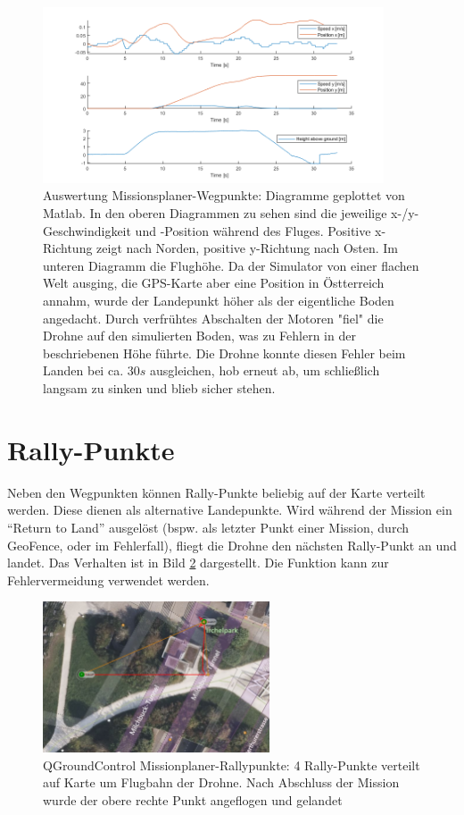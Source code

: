 \begin{figure}[h]
    \centering
    \includegraphics[width=0.9\textwidth]{images/mission_plan_mission_dia.png}
    \caption[Auswertung Missionsplaner-Wegpunkte]{Auswertung Missionsplaner-Wegpunkte: Diagramme geplottet von Matlab. In den oberen Diagrammen zu sehen sind die jeweilige x-/y-Geschwindigkeit und -Position während des Fluges. Positive x-Richtung zeigt nach Norden, positive y-Richtung nach Osten. Im unteren Diagramm die Flughöhe. Da der Simulator von einer flachen Welt ausging, die GPS-Karte aber eine Position in Östterreich annahm, wurde der Landepunkt höher als der eigentliche Boden angedacht. Durch verfrühtes Abschalten der Motoren "fiel" die Drohne auf den simulierten Boden, was zu Fehlern in der beschriebenen Höhe führte. Die Drohne konnte diesen Fehler beim Landen bei ca. $30s$ ausgleichen, hob erneut ab, um schließlich langsam zu sinken und blieb sicher stehen.}
    \label{fig:qgc_mission_plan_wp_dia}
\end{figure}

\section{Rally-Punkte}
Neben den Wegpunkten können Rally-Punkte beliebig auf der Karte verteilt werden. Diese dienen als alternative Landepunkte. Wird während der Mission ein \enquote{Return to Land} ausgelöst (bspw. als letzter Punkt einer Mission, durch GeoFence, oder im Fehlerfall), fliegt die Drohne den nächsten Rally-Punkt an und landet. Das Verhalten ist in Bild \ref{fig:qgc_mission_plan_rp} dargestellt. Die Funktion kann zur Fehlervermeidung verwendet werden.

\begin{figure}[h]
    \centering
    \includegraphics[width=0.6\textwidth]{images/mission_plan_rally.png}
    \caption[QGroundControl Missionplaner-Rallypunkte]{QGroundControl Missionplaner-Rallypunkte: 4 Rally-Punkte verteilt auf Karte um Flugbahn der Drohne. Nach Abschluss der Mission wurde der obere rechte Punkt angeflogen und gelandet}
    \label{fig:qgc_mission_plan_rp}
\end{figure}

